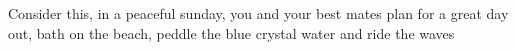 Consider this, in a peaceful sunday, you and your best mates plan for a great day out, bath on the beach, peddle the blue crystal water and ride the waves 